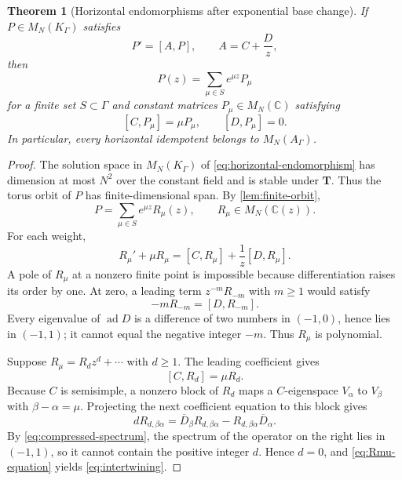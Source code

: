 \documentclass[11pt]{article}
\numberwithin{equation}{section}
\newtheorem{theorem}{Theorem}[section]
\theoremstyle{definition}
\theoremstyle{remark}
\newcommand{\C}{\mathbb C}
\begin{document}
\begin{theorem}[Horizontal endomorphisms after exponential base change]
\label{thm:endomorphism-normal-form}
If $P\in M_N(K_\Gamma)$ satisfies
\begin{equation}\label{eq:horizontal-endomorphism}
  P'=[A,P],
  \qquad A=C+\frac Dz,
\end{equation}
then
\begin{equation}\label{eq:endomorphism-expansion}
  P(z)=\sum_{\mu\in S}e^{\mu z}P_\mu
\end{equation}
for a finite set $S\subset\Gamma$ and constant matrices
$P_\mu\in M_N(\C)$ satisfying
\begin{equation}\label{eq:intertwining}
  [C,P_\mu]=\mu P_\mu,
  \qquad
  [D,P_\mu]=0.
\end{equation}
In particular, every horizontal idempotent belongs to $M_N(A_\Gamma)$.
\end{theorem}

\begin{proof}
The solution space in $M_N(K_\Gamma)$ of
\eqref{eq:horizontal-endomorphism} has dimension at most $N^2$ over the
constant field and is stable under $\mathbf T$.  Thus the torus orbit of $P$
has finite-dimensional span.  By \cref{lem:finite-orbit},
\[
  P=\sum_{\mu\in S}e^{\mu z}R_\mu(z),
  \qquad R_\mu\in M_N(\C(z)).
\]
For each weight,
\begin{equation}\label{eq:Rmu-equation}
  R_\mu'+\mu R_\mu
  =[C,R_\mu]+\frac1z[D,R_\mu].
\end{equation}
A pole of $R_\mu$ at a nonzero finite point is impossible because
differentiation raises its order by one.  At zero, a leading term
$z^{-m}R_{-m}$ with $m\ge1$ would satisfy
\[
  -mR_{-m}=[D,R_{-m}].
\]
Every eigenvalue of $\operatorname{ad}D$ is a difference of two numbers in
$(-1,0)$, hence lies in $(-1,1)$; it cannot equal the negative integer
$-m$.  Thus $R_\mu$ is polynomial.

Suppose $R_\mu=R_dz^d+\cdots$ with $d\ge1$.  The leading coefficient gives
\[
  [C,R_d]=\mu R_d.
\]
Because $C$ is semisimple, a nonzero block of $R_d$ maps a
$C$-eigenspace $V_\alpha$ to $V_\beta$ with $\beta-\alpha=\mu$.
Projecting the next coefficient equation to this block gives
\[
  dR_{d,\beta\alpha}
  =\overline D_\beta R_{d,\beta\alpha}
   -R_{d,\beta\alpha}\overline D_\alpha.
\]
By \eqref{eq:compressed-spectrum}, the spectrum of the operator on the
right lies in $(-1,1)$, so it cannot contain the positive integer $d$.
Hence $d=0$, and \eqref{eq:Rmu-equation} yields
\eqref{eq:intertwining}.
\end{proof}
\end{document}
